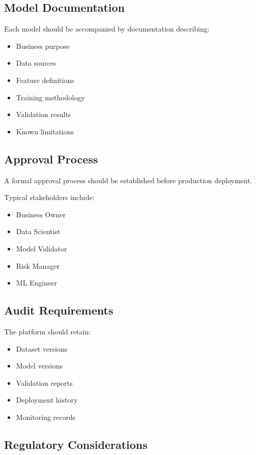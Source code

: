 \subsection{Model Documentation}

Each model should be accompanied by documentation describing:

\begin{itemize}
    \item Business purpose
    \item Data sources
    \item Feature definitions
    \item Training methodology
    \item Validation results
    \item Known limitations
\end{itemize}

\subsection{Approval Process}

A formal approval process should be established before production deployment.

Typical stakeholders include:

\begin{itemize}
    \item Business Owner
    \item Data Scientist
    \item Model Validator
    \item Risk Manager
    \item ML Engineer
\end{itemize}

\subsection{Audit Requirements}

The platform should retain:

\begin{itemize}
    \item Dataset versions
    \item Model versions
    \item Validation reports
    \item Deployment history
    \item Monitoring records
\end{itemize}

\subsection{Regulatory Considerations}

